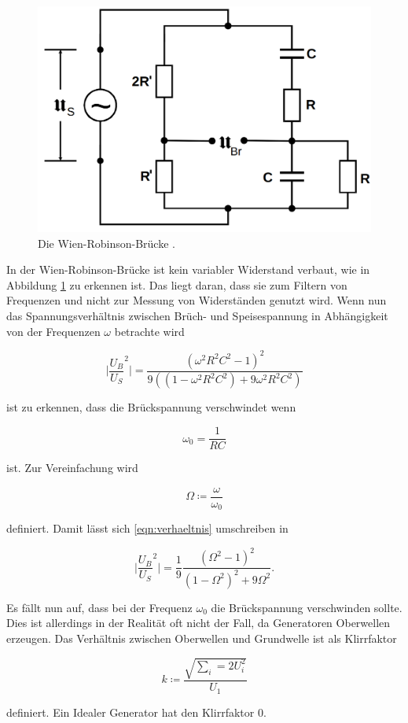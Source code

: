 \begin{figure}
    \centering
    \includegraphics[scale=0.25]{content/Wien-Robinson-Bruecke.png}
    \caption{Die Wien-Robinson-Brücke \cite[S. 223]{anleitung}.}
    \label{fig:wien}
\end{figure}

In der Wien-Robinson-Brücke ist kein variabler Widerstand verbaut, wie in Abbildung \ref{fig:wien}
zu erkennen ist.
Das liegt daran, dass sie zum Filtern von Frequenzen und nicht zur Messung von Widerständen genutzt wird.
Wenn nun das Spannungsverhältnis zwischen Brüch- und Speisespannung in Abhängigkeit von der Frequenzen $\omega$ betrachte wird 

\begin{equation}
    \lvert \frac{U_B}{U_S}^2 \rvert = \frac{(\omega^2R^2C^2-1)^2}{9((1-\omega^2R^2C^2) + 9 \omega^2 R^2 C^2)}
    \label{eqn:verhaeltnis}
\end{equation}

ist zu erkennen, dass die Brückspannung verschwindet wenn 

\begin{equation}
    \omega_0 = \frac{1}{RC}
\end{equation}

ist. Zur Vereinfachung wird 

\begin{equation*}
    \Omega \coloneq \frac{\omega}{\omega_0}
\end{equation*}

definiert. Damit lässt sich \eqref{eqn:verhaeltnis} umschreiben in

\begin{equation}
    \lvert \frac{U_B}{U_S}^2 \rvert = \frac{1}{9} \frac{(\Omega^2 -1)^2}{(1-\Omega^2)^2 + 9\Omega^2}.
\end{equation}

Es fällt nun auf, dass bei der Frequenz $\omega_0$ die Brückspannung verschwinden sollte.
Dies ist allerdings in der Realität oft nicht der Fall, da Generatoren Oberwellen erzeugen.
Das Verhältnis zwischen Oberwellen und Grundwelle ist als Klirrfaktor

\begin{equation*}
    k \coloneq \frac{\sqrt{\sum_i=2 U_i^2}}{U_1}
\end{equation*}

definiert. Ein Idealer Generator hat den Klirrfaktor 0.